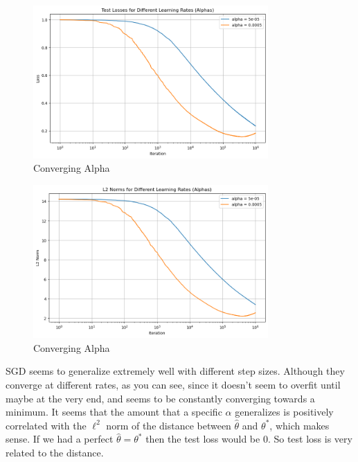 \documentclass[12pt]{article}
\theoremstyle{definitionstyle}
\begin{document}
\begin{enumerate}[leftmargin=\labelsep]
\begin{enumerate}
            \begin{figure}[H]
                \centering
                \includegraphics[width=0.8\textwidth]{test_wrt_alpha.png}
                \caption{Converging Alpha}
                \label{fig:converging_alpha}
            \end{figure}

            \begin{figure}[H]
                \centering
                \includegraphics[width=0.8\textwidth]{l2_wrt_alpha.png}
                \caption{Converging Alpha}
                \label{fig:converging_alpha}
            \end{figure}
            SGD seems to generalize extremely well with different step sizes. Although they converge at different rates, as you can see, since it doesn't seem to overfit until maybe at the very end, and seems to be constantly converging towards a minimum. It seems that the amount that a specific $\alpha$ generalizes is positively correlated with the $\ell^2$ norm of the distance between $\hat \theta$ and $\theta^*$, which makes sense. If we had a perfect $\hat \theta = \theta^*$ then the test loss would be 0. So test loss is very related to the distance.
        \end{enumerate}


\end{enumerate}
\end{document}
